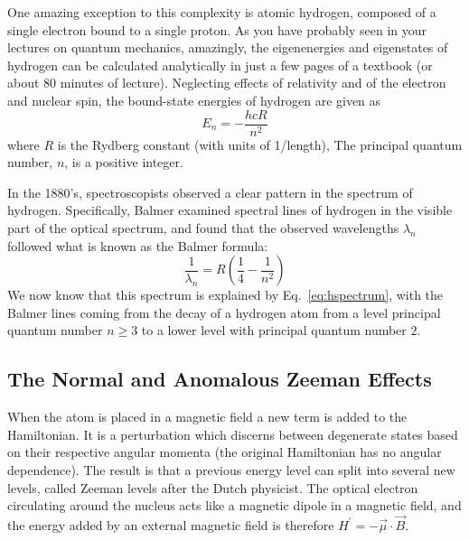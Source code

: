 \documentclass{../lab}
\begin{document}
One amazing exception to this complexity is atomic hydrogen, composed of a single electron bound to a single proton.  As you have probably seen in your lectures on quantum mechanics, amazingly, the eigenenergies and eigenstates of hydrogen can be calculated analytically in just a few pages of a textbook (or about 80 minutes of lecture).  Neglecting effects of relativity and of the electron and nuclear spin, the bound-state energies of hydrogen are given as
\begin{equation}
    E_n = - \frac{ h c R}{n^2} \label{eq:hspectrum}
\end{equation}
where $R$ is the Rydberg constant (with units of 1/length),  The principal quantum number, $n$, is a positive integer.

In the 1880's, spectroscopists observed a clear pattern in the spectrum of hydrogen.  Specifically, Balmer examined spectral lines of hydrogen in the visible part of the optical spectrum, and found that the observed wavelengths $\lambda_n$ followed what is known as the Balmer formula:
\begin{equation}
    \frac{1}{\lambda_n} = R \left(\frac{1}{4} - \frac{1}{n^2}\right)
\end{equation}
We now know that this spectrum is explained by Eq.\ \ref{eq:hspectrum}, with the Balmer lines coming from the decay of a hydrogen atom from a level principal quantum number $n \geq 3$ to a lower level with principal quantum number $2$.

\subsection{The Normal and Anomalous Zeeman Effects}


When the atom is placed in a magnetic field a new term is added to the Hamiltonian. It is a perturbation which discerns between degenerate states based on their respective angular momenta (the original Hamiltonian has no angular dependence). The result is that a previous energy level can split into several new levels, called Zeeman levels after the Dutch physicist. The optical electron circulating around the nucleus acts like a magnetic dipole in a magnetic field, and the energy added by an external magnetic field is therefore $H^\prime = -\vec \mu \cdot\vec B$. 
\end{document}
